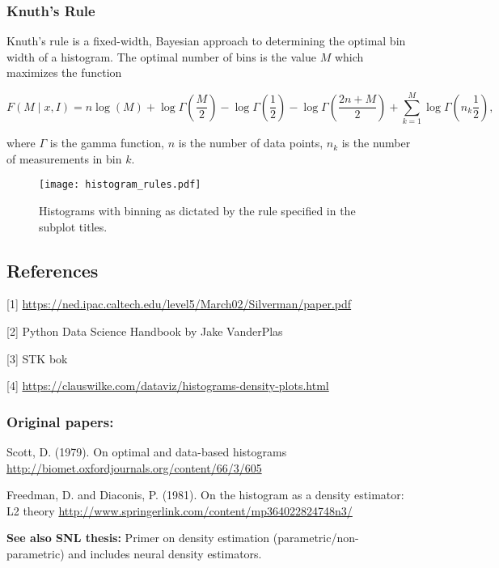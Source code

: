 \subsubsection{Knuth's Rule}

Knuth's rule is a fixed-width, Bayesian approach to determining the optimal bin width of a histogram. The optimal number of bins is the value $M$ which maximizes the function 

\begin{equation}
    F(M \mid x, I) = n \log(M) + \log \Gamma \left(\frac{M}{2} \right) - \log \Gamma \left(\frac{1}{2} \right) - \log \Gamma \left(\frac{2n + M}{2} \right) + \sum_{k=1}^{M} \log \Gamma \left(n_k \frac{1}{2} \right),
\end{equation}

where $\Gamma$ is the gamma function, $n$ is the number of data points, $n_k$ is the number of measurements in bin $k$.


\begin{figure}[H]
    \centering
    \texttt{[image: histogram\_rules.pdf]}
    \caption{Histograms with binning as dictated by the rule specified in the subplot titles.}
    \label{fig:histogram_rules}
\end{figure}


\subsection*{References}

[1] \url{https://ned.ipac.caltech.edu/level5/March02/Silverman/paper.pdf}

[2] Python Data Science Handbook by Jake VanderPlas

[3] STK bok

[4] \url{https://clauswilke.com/dataviz/histograms-density-plots.html}

\subsubsection*{Original papers:} 

Scott, D. (1979). On optimal and data-based histograms \url{http://biomet.oxfordjournals.org/content/66/3/605}

Freedman, D. and Diaconis, P. (1981). On the histogram as a density estimator: L2 theory \url{http://www.springerlink.com/content/mp364022824748n3/}

\textbf{See also SNL thesis:} Primer on density estimation (parametric/non-parametric) and includes neural density estimators. 

